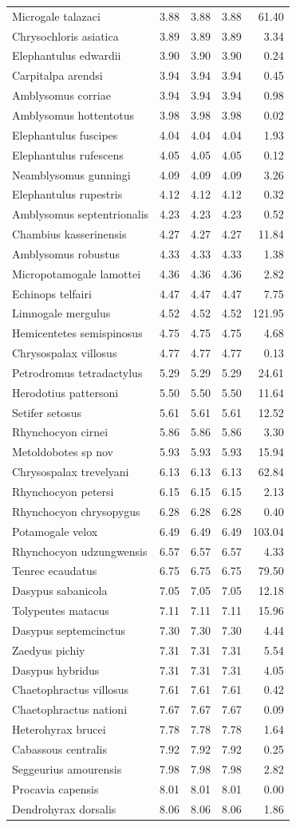 \documentclass[10pt,letterpaper]{article}
\begin{document}
\begin{longtable}[]{@{}lrrrr@{}}
Microgale talazaci & 3.88 & 3.88 & 3.88 & 61.40\tabularnewline
Chrysochloris asiatica & 3.89 & 3.89 & 3.89 & 3.34\tabularnewline
Elephantulus edwardii & 3.90 & 3.90 & 3.90 & 0.24\tabularnewline
Carpitalpa arendsi & 3.94 & 3.94 & 3.94 & 0.45\tabularnewline
Amblysomus corriae & 3.94 & 3.94 & 3.94 & 0.98\tabularnewline
Amblysomus hottentotus & 3.98 & 3.98 & 3.98 & 0.02\tabularnewline
Elephantulus fuscipes & 4.04 & 4.04 & 4.04 & 1.93\tabularnewline
Elephantulus rufescens & 4.05 & 4.05 & 4.05 & 0.12\tabularnewline
Neamblysomus gunningi & 4.09 & 4.09 & 4.09 & 3.26\tabularnewline
Elephantulus rupestris & 4.12 & 4.12 & 4.12 & 0.32\tabularnewline
Amblysomus septentrionalis & 4.23 & 4.23 & 4.23 & 0.52\tabularnewline
Chambius kasserinensis & 4.27 & 4.27 & 4.27 & 11.84\tabularnewline
Amblysomus robustus & 4.33 & 4.33 & 4.33 & 1.38\tabularnewline
Micropotamogale lamottei & 4.36 & 4.36 & 4.36 & 2.82\tabularnewline
Echinops telfairi & 4.47 & 4.47 & 4.47 & 7.75\tabularnewline
Limnogale mergulus & 4.52 & 4.52 & 4.52 & 121.95\tabularnewline
Hemicentetes semispinosus & 4.75 & 4.75 & 4.75 & 4.68\tabularnewline
Chrysospalax villosus & 4.77 & 4.77 & 4.77 & 0.13\tabularnewline
Petrodromus tetradactylus & 5.29 & 5.29 & 5.29 & 24.61\tabularnewline
Herodotius pattersoni & 5.50 & 5.50 & 5.50 & 11.64\tabularnewline
Setifer setosus & 5.61 & 5.61 & 5.61 & 12.52\tabularnewline
Rhynchocyon cirnei & 5.86 & 5.86 & 5.86 & 3.30\tabularnewline
Metoldobotes sp nov & 5.93 & 5.93 & 5.93 & 15.94\tabularnewline
Chrysospalax trevelyani & 6.13 & 6.13 & 6.13 & 62.84\tabularnewline
Rhynchocyon petersi & 6.15 & 6.15 & 6.15 & 2.13\tabularnewline
Rhynchocyon chrysopygus & 6.28 & 6.28 & 6.28 & 0.40\tabularnewline
Potamogale velox & 6.49 & 6.49 & 6.49 & 103.04\tabularnewline
Rhynchocyon udzungwensis & 6.57 & 6.57 & 6.57 & 4.33\tabularnewline
Tenrec ecaudatus & 6.75 & 6.75 & 6.75 & 79.50\tabularnewline
Dasypus sabanicola & 7.05 & 7.05 & 7.05 & 12.18\tabularnewline
Tolypeutes matacus & 7.11 & 7.11 & 7.11 & 15.96\tabularnewline
Dasypus septemcinctus & 7.30 & 7.30 & 7.30 & 4.44\tabularnewline
Zaedyus pichiy & 7.31 & 7.31 & 7.31 & 5.54\tabularnewline
Dasypus hybridus & 7.31 & 7.31 & 7.31 & 4.05\tabularnewline
Chaetophractus villosus & 7.61 & 7.61 & 7.61 & 0.42\tabularnewline
Chaetophractus nationi & 7.67 & 7.67 & 7.67 & 0.09\tabularnewline
Heterohyrax brucei & 7.78 & 7.78 & 7.78 & 1.64\tabularnewline
Cabassous centralis & 7.92 & 7.92 & 7.92 & 0.25\tabularnewline
Seggeurius amourensis & 7.98 & 7.98 & 7.98 & 2.82\tabularnewline
Procavia capensis & 8.01 & 8.01 & 8.01 & 0.00\tabularnewline
Dendrohyrax dorsalis & 8.06 & 8.06 & 8.06 & 1.86\tabularnewline

\end{longtable}
\end{document}
